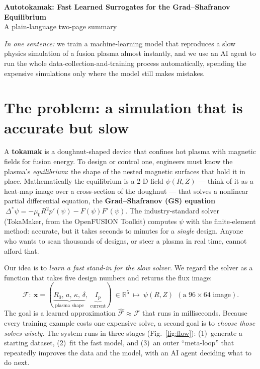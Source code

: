 \documentclass[10pt]{article}
\newcommand{\bx}{\mathbf{x}}\newcommand{\bz}{\mathbf{z}}\newcommand{\by}{\mathbf{y}}
\newcommand{\Ffwd}{\mathcal{F}}\newcommand{\Fhat}{\hat{\mathcal{F}}}
\newcommand{\R}{\mathbb{R}}\newcommand{\E}{\mathbb{E}}\newcommand{\GP}{\mathcal{GP}}
\newcommand{\Lstar}{\Delta^{\!*}}
\begin{document}
\begin{center}
{\Large\bfseries Autotokamak: Fast Learned Surrogates for the Grad--Shafranov Equilibrium}\\[2pt]
{\normalsize A plain-language two-page summary}
\end{center}
\vspace{-2pt}

\noindent\textit{In one sentence:} we train a machine-learning model that reproduces a slow
physics simulation of a fusion plasma almost instantly, and we use an AI agent to run the whole
data-collection-and-training process automatically, spending the expensive simulations only where
the model still makes mistakes.

\section{The problem: a simulation that is accurate but slow}
A \textbf{tokamak} is a doughnut-shaped device that confines hot plasma with magnetic fields for
fusion energy. To design or control one, engineers must know the plasma's \emph{equilibrium}: the
shape of the nested magnetic surfaces that hold it in place. Mathematically the equilibrium is a
2-D field $\psi(R,Z)$ --- think of it as a heat-map image over a cross-section of the doughnut ---
that solves a nonlinear partial differential equation, the \textbf{Grad--Shafranov (GS) equation}
$\ \Lstar\psi = -\mu_0 R^2 p'(\psi) - F(\psi)F'(\psi)$. The industry-standard solver (TokaMaker,
from the OpenFUSION Toolkit) computes $\psi$ with the finite-element method: accurate, but it takes
seconds to minutes for a \emph{single} design. Anyone who wants to scan thousands of designs, or
steer a plasma in real time, cannot afford that.

Our idea is to \emph{learn a fast stand-in for the slow solver}. We regard the solver as a function
that takes five design numbers and returns the flux image:
$$
\Ffwd:\ \bx=(\underbrace{R_0,\,a,\,\kappa,\,\delta}_{\text{plasma shape}},\ \underbrace{I_p}_{\text{current}})\ \in\R^5\ \longmapsto\ \psi(R,Z)\ \ (\text{a } 96\times64 \text{ image}).
$$
The goal is a learned approximation $\Fhat\approx\Ffwd$ that runs in milliseconds. Because every
training example costs one expensive solve, a second goal is to \emph{choose those solves wisely}.
The system runs in three stages (Fig.~\ref{fig:flow}): (1)~generate a starting dataset, (2)~fit the
fast model, and (3)~an outer ``meta-loop'' that repeatedly improves the data and the model, with an
AI agent deciding what to do next.
\end{document}
